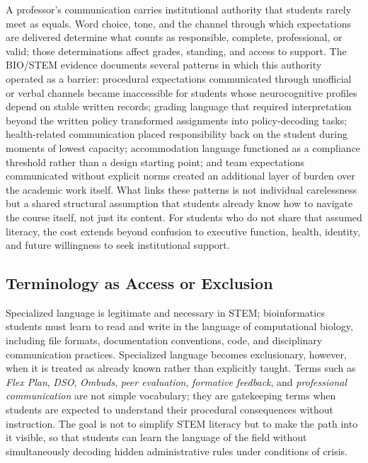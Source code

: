 \documentclass[11pt]{article}
\begin{document}
A professor's communication carries institutional authority that students rarely meet as equals. Word choice, tone, and the channel through which expectations are delivered determine what counts as responsible, complete, professional, or valid; those determinations affect grades, standing, and access to support. The BIO/STEM evidence documents several patterns in which this authority operated as a barrier: procedural expectations communicated through unofficial or verbal channels became inaccessible for students whose neurocognitive profiles depend on stable written records; grading language that required interpretation beyond the written policy transformed assignments into policy-decoding tasks; health-related communication placed responsibility back on the student during moments of lowest capacity; accommodation language functioned as a compliance threshold rather than a design starting point; and team expectations communicated without explicit norms created an additional layer of burden over the academic work itself. What links these patterns is not individual carelessness but a shared structural assumption that students already know how to navigate the course itself, not just its content. For students who do not share that assumed literacy, the cost extends beyond confusion to executive function, health, identity, and future willingness to seek institutional support.

\subsection*{Terminology as Access or Exclusion}

Specialized language is legitimate and necessary in STEM; bioinformatics students must learn to read and write in the language of computational biology, including file formats, documentation conventions, code, and disciplinary communication practices. Specialized language becomes exclusionary, however, when it is treated as already known rather than explicitly taught. Terms such as \textit{Flex Plan}, \textit{DSO}, \textit{Ombuds}, \textit{peer evaluation}, \textit{formative feedback}, and \textit{professional communication} are not simple vocabulary; they are gatekeeping terms when students are expected to understand their procedural consequences without instruction. The goal is not to simplify STEM literacy but to make the path into it visible, so that students can learn the language of the field without simultaneously decoding hidden administrative rules under conditions of crisis.
\end{document}
